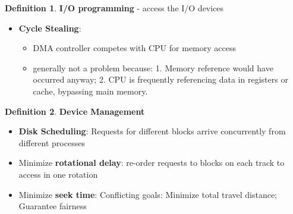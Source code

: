 \documentclass[11pt,a4paper]{article}
\theoremstyle{definition}
\newtheorem{definition}{Definition}[section]
\newenvironment{myitemize}
{ \begin{itemize}
    \setlength{\itemsep}{5pt}
    \setlength{\parskip}{0pt}
    \setlength{\parsep}{0pt}     }
{ \end{itemize}                  }
\begin{document}
\begin{definition}{\textbf{I/O programming} - access the I/O devices}
\begin{myitemize}
\begin{myitemize}
\begin{tcolorbox}
			write\_reg(opcode, read);  // start op
			
			block to wait for interrupt;

			\end{tcolorbox}
						\begin{myitemize}
				\item Writing opcode triggers DMA controller
				\item DMA controller issues interrupt after n chars in memory
			\end{myitemize}
			\item \textbf{Cycle Stealing}: 
			\begin{myitemize}
				\item DMA controller competes with CPU for memory access 
				\item generally not a problem because: 1. Memory reference would have occurred anyway; 2. CPU is frequently referencing data in registers or cache, bypassing main memory.
			\end{myitemize}
		\end{myitemize}
	\end{myitemize}
\end{definition}

\begin{definition}{\textbf{Device Management}}
	\begin{myitemize}
		\item \textbf{Disk Scheduling}: Requests for different blocks arrive concurrently from different processes
		\item Minimize \textbf{rotational delay}: re-order requests to blocks on each track to access in one rotation
		\item Minimize \textbf{seek time}: Conflicting goals: Minimize total travel distance; Guarantee fairness
	\end{myitemize}
\end{definition}
\end{document}

